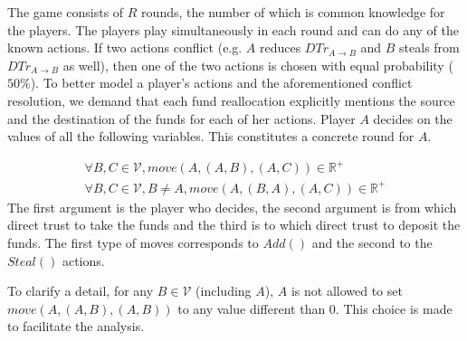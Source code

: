   The game consists of $R$ rounds, the number of which is common knowledge for the players. The players play simultaneously in
  each round and can do any of the known actions. If two actions conflict (e.g. $A$ reduces $DTr_{A \rightarrow B}$ and $B$
  steals from $DTr_{A \rightarrow B}$ as well), then one of the two actions is chosen with equal probability ($50\%$). To
  better model a player's actions and the aforementioned conflict resolution, we demand that each fund reallocation explicitly
  mentions the source and the destination of the funds for each of her actions. Player $A$ decides on the values of all the
  following variables. This constitutes a concrete round for $A$.
  
  \begin{gather*}
    \forall B, C \in \mathcal{V}, move\left(A, \left(A, B\right), \left(A, C\right) \right) \in \mathbb{R^+} \\
    \forall B, C \in \mathcal{V}, B \neq A, move\left(A, \left(B, A\right), \left(A, C\right) \right) \in \mathbb{R^+}
  \end{gather*}
  The first argument is the player who decides, the second argument is from which direct trust to take the funds and the third
  is to which direct trust to deposit the funds. The first type of moves corresponds to $Add\left(\right)$ and the second to
  the $Steal\left(\right)$ actions.
  
  To clarify a detail, for any $B \in \mathcal{V}$ (including $A$), $A$ is not allowed to set $move\left(A, \left(A, B\right),
  \left(A, B\right) \right)$ to any value different than 0. This choice is made to facilitate the analysis.
  
